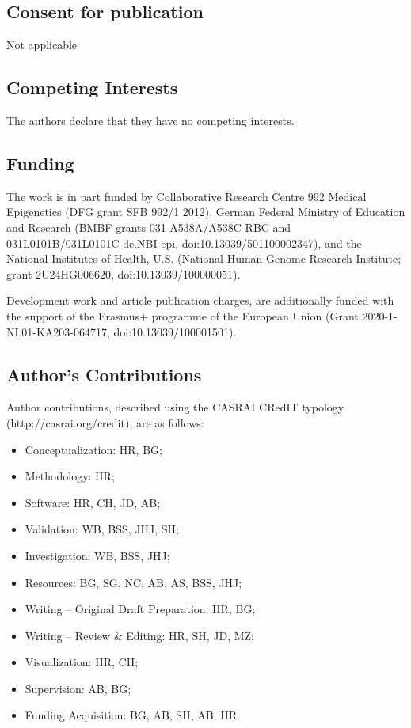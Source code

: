 \documentclass[a4paper,num-refs]{oup-contemporary}
\begin{document}
\subsection{Consent for publication}
Not applicable

\subsection{Competing Interests}
The authors declare that they have no competing interests.

\subsection{Funding}
The work is in part funded by Collaborative Research Centre 992 Medical Epigenetics (DFG grant SFB 992/1 2012), German Federal Ministry of Education and Research (BMBF grants 031 A538A/A538C RBC and 031L0101B/031L0101C de.NBI-epi, doi:10.13039/501100002347), and the National Institutes of Health, U.S. (National Human Genome Research Institute; grant 2U24HG006620, doi:10.13039/100000051).

Development work and article publication charges, are additionally funded with the support of the Erasmus+ programme of the European Union (Grant 2020-1-NL01-KA203-064717, doi:10.13039/100001501).

\subsection{Author's Contributions}
Author contributions, described using the CASRAI CRedIT typology (http://casrai.org/credit), are as follows:

\begin{itemize}
    \item Conceptualization: HR, BG;
    \item Methodology: HR;
    \item Software: HR, CH, JD, AB;
    \item Validation: WB, BSS, JHJ, SH;
    \item Investigation: WB, BSS, JHJ;
    \item Resources: BG, SG, NC, AB, AS, BSS, JHJ;
    \item Writing – Original Draft Preparation: HR, BG;
    \item Writing – Review \& Editing: HR, SH, JD, MZ;
    \item Visualization: HR, CH;
    \item Supervision: AB, BG;
    \item Funding Acquisition: BG, AB, SH, AB, HR.
\end{itemize}
\end{document}
